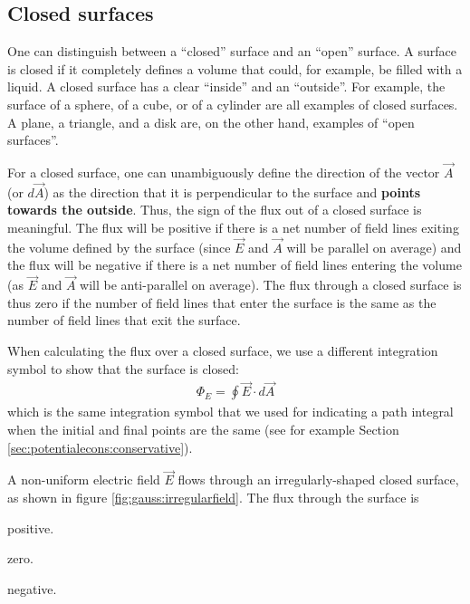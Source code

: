 \subsection{Closed surfaces}
\label{sec:gauss:closedsurfaces}
One can distinguish between a ``closed'' surface and an ``open'' surface. A surface is closed if it completely defines a volume that could, for example, be filled with a liquid.  A closed surface has a clear ``inside'' and an ``outside''. For example, the surface of a sphere, of a cube, or of a cylinder are all examples of closed surfaces. A plane, a triangle, and a disk are, on the other hand, examples of ``open surfaces''.

For a closed surface, one can unambiguously define the direction of the vector $\vec A$ (or $d\vec A$) as the direction that it is perpendicular to the surface and \textbf{points towards the outside}. Thus, the sign of the flux out of a closed surface is meaningful. The flux will be positive if there is a net number of field lines exiting the volume defined by the surface (since $\vec E$ and $\vec A$ will be parallel on average) and the flux will be negative if there is a net number of field lines entering the volume (as $\vec E$ and $\vec A$ will be anti-parallel on average). The flux through a closed surface is thus zero if the number of field lines that enter the surface is the same as the number of field lines that exit the surface.

When calculating the flux over a closed surface, we use a different integration symbol to show that the surface is closed:
\begin{align*}
\Phi_E=\oint \vec E\cdot d\vec A
\end{align*}
which is the same integration symbol that we used for indicating a path integral when the initial and final points are the same (see for example Section \ref{sec:potentialecons:conservative}).
\begin{checkpoint}\label{cp:gauss:unitsofflux}
\begin{MCquestion}{A non-uniform electric field $\vec E$ flows through an irregularly-shaped closed surface, as shown in figure \ref{fig:gauss:irregularfield}. The flux through the surface is}
 \item positive.
 \item zero. \correct
\item negative.
\end{MCquestion}
\end{checkpoint}

